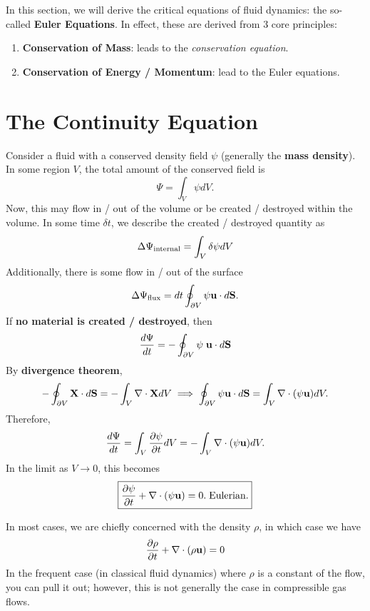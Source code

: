 In this section, we will derive the critical equations of fluid dynamics: the so-called \textbf{Euler Equations}. In effect, these are derived from 3 core principles:

\begin{enumerate}
    \item \textbf{Conservation of Mass}: leads to the \emph{conservation equation}.
    \item \textbf{Conservation of Energy / Momentum}: lead to the Euler equations.
\end{enumerate}

\section{The Continuity Equation}

Consider a fluid with a conserved density field $\psi$ (generally the \textbf{mass density}). In some region $V$, the total amount of the conserved field is
\[
\Psi = \int_V \psi dV.
\]
Now, this may flow in / out of the volume or be created / destroyed within the volume. In some time $\delta t$, we describe the created / destroyed quantity as
\[
\Delta \Psi_{\rm internal} = \int_V \delta \psi dV
\]
Additionally, there is some flow in / out of the surface
\[
\Delta \Psi_{\rm flux} = dt\oint_{\partial V} \psi {\bf u} \cdot d{\bf S}.
\]
If \textbf{no material is created / destroyed}, then
\[
\frac{d\Psi}{dt} = -\oint_{\partial V} \psi \;{\bf u} \cdot d{\bf S} 
\]
By \textbf{divergence theorem},
\[
-\oint_{\partial V} {\bf X} \cdot d{\bf S} = -\int_V \nabla \cdot {\bf X} dV \implies \oint_{\partial V} \psi {\bf u} \cdot d{\bf S} = \int_V \nabla \cdot (\psi {\bf u}) dV.
\]
Therefore,
\[
\frac{d\Psi}{dt} = \int_V \frac{\partial\psi}{\partial t} dV = - \int_V \nabla \cdot (\psi {\bf u}) dV.
\]
In the limit as $V \to 0$, this becomes
\begin{equation}
\label{eq:conservation-equation-eulerian}
\boxed{
\frac{\partial\psi}{\partial t} + \nabla \cdot (\psi {\bf u}) = 0.\;\text{Eulerian.}
}
\end{equation}
\begin{remark}
    In most cases, we are chiefly concerned with the density $\rho$, in which case we have
    \[
    \frac{\partial\rho}{\partial t} + \nabla \cdot (\rho {\bf u}) = 0
    \]
    In the frequent case (in classical fluid dynamics) where $\rho$ is a constant of the flow, you can pull it out; however, this is not generally the case in compressible gas flows.
\end{remark}

